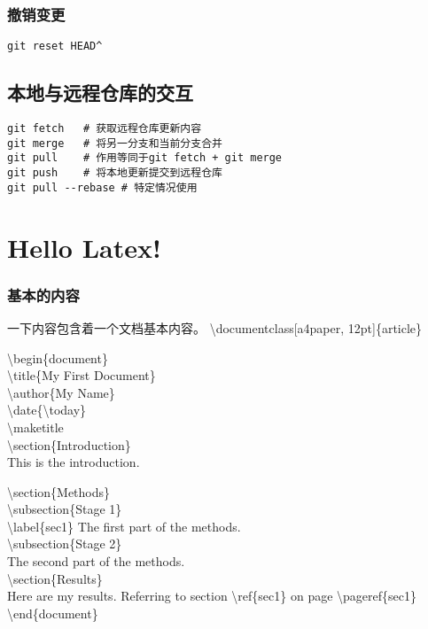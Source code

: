 \documentclass{article}
\begin{document}
		\subsubsection{撤销变更}
			\begin{lstlisting}
git reset HEAD^
			\end{lstlisting}
			

	\subsection{本地与远程仓库的交互}
		\begin{lstlisting}
git fetch	# 获取远程仓库更新内容
git merge	# 将另一分支和当前分支合并
git pull	# 作用等同于git fetch + git merge
git push	# 将本地更新提交到远程仓库
git pull --rebase # 特定情况使用
		\end{lstlisting}
		
	\section{Hello Latex!}	
	\subsubsection{基本的内容}
	一下内容包含着一个文档基本内容。
		\textbackslash documentclass[a4paper, 12pt]\{article\}
		
		\textbackslash begin\{document\}\\
		\textbackslash title\{My First Document\}\\
		\textbackslash author\{My Name\}\\
		\textbackslash date\{\textbackslash today\}\\
		\textbackslash maketitle\\
		
		\textbackslash section\{Introduction\}\\
		This is the introduction.
		
		\textbackslash section\{Methods\}\\
		
		\textbackslash subsection\{Stage 1\}\\
		\textbackslash label\{sec1\} The first part of the methods.\\
		
		\textbackslash subsection\{Stage 2\}\\
		The second part of the methods.\\
		
		\textbackslash section\{Results\}\\
		Here are my results. Referring to section \textbackslash ref\{sec1\} on page \textbackslash pageref\{sec1\}\\
		\textbackslash end\{document\}\\
		
\end{document}
